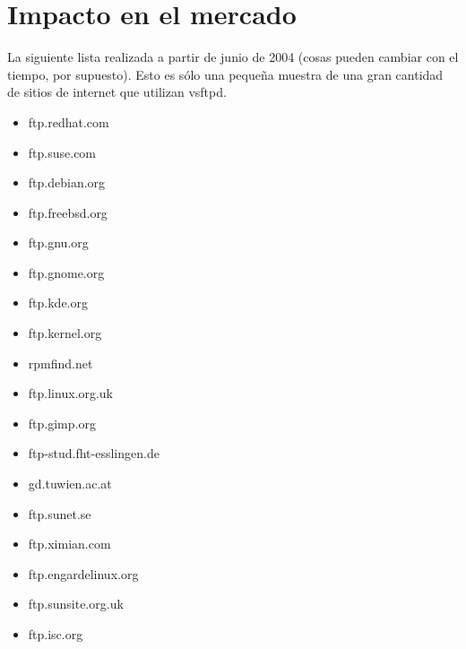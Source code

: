 \section{Impacto en el mercado}
La siguiente lista realizada a partir de junio de 2004 (cosas pueden cambiar con el tiempo, por supuesto). Esto es sólo una pequeña muestra de una gran cantidad de sitios de internet que utilizan vsftpd.
\begin{itemize}
\item ftp.redhat.com
\item ftp.suse.com
\item ftp.debian.org
\item ftp.freebsd.org
\item ftp.gnu.org
\item ftp.gnome.org
\item ftp.kde.org
\item ftp.kernel.org
\item rpmfind.net
\item ftp.linux.org.uk
\item ftp.gimp.org
\item ftp-stud.fht-esslingen.de
\item gd.tuwien.ac.at
\item ftp.sunet.se
\item ftp.ximian.com
\item ftp.engardelinux.org
\item ftp.sunsite.org.uk
\item ftp.isc.org
\end{itemize}